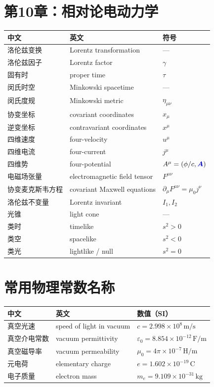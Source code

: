 \documentclass[11pt,a4paper,openany,oneside]{book}
\newcommand{\vecA}{\textcolor{blue!70!black}{\vect{A}}}
\newcommand{\eps}{\varepsilon}
\newcommand{\muz}{\mu_0}
\newcommand{\vect}[1]{\bm{#1}}
\begin{document}
\section{第10章：相对论电动力学}

\begin{center}
\begin{tabular}{@{}lll@{}}
\toprule
\textbf{中文} & \textbf{英文} & \textbf{符号} \\
\midrule
洛伦兹变换 & Lorentz transformation & — \\
洛伦兹因子 & Lorentz factor & $\gamma$ \\
固有时 & proper time & $\tau$ \\
闵氏时空 & Minkowski spacetime & — \\
闵氏度规 & Minkowski metric & $\eta_{\mu\nu}$ \\
协变坐标 & covariant coordinates & $x_\mu$ \\
逆变坐标 & contravariant coordinates & $x^\mu$ \\
四维速度 & four-velocity & $u^\mu$ \\
四维电流 & four-current & $j^\mu$ \\
四维势 & four-potential & $A^\mu=(\phi/c,\vecA)$ \\
电磁场张量 & electromagnetic field tensor & $F^{\mu\nu}$ \\
协变麦克斯韦方程 & covariant Maxwell equations & $\partial_\mu F^{\mu\nu}=\muz j^\nu$ \\
洛伦兹不变量 & Lorentz invariant & $I_1, I_2$ \\
光锥 & light cone & — \\
类时 & timelike & $s^2>0$ \\
类空 & spacelike & $s^2<0$ \\
类光 & lightlike / null & $s^2=0$ \\
\bottomrule
\end{tabular}
\end{center}

\section{常用物理常数名称}

\begin{center}
\begin{tabular}{@{}lll@{}}
\toprule
\textbf{中文} & \textbf{英文} & \textbf{数值（SI）} \\
\midrule
真空光速 & speed of light in vacuum & $c=2.998\times 10^8\,\text{m/s}$ \\
真空介电常数 & vacuum permittivity & $\eps_0=8.854\times 10^{-12}\,\text{F/m}$ \\
真空磁导率 & vacuum permeability & $\mu_0=4\pi\times 10^{-7}\,\text{H/m}$ \\
元电荷 & elementary charge & $e=1.602\times 10^{-19}\,\text{C}$ \\
电子质量 & electron mass & $m_e=9.109\times 10^{-31}\,\text{kg}$ \\
\bottomrule
\end{tabular}
\end{center}
\end{document}
